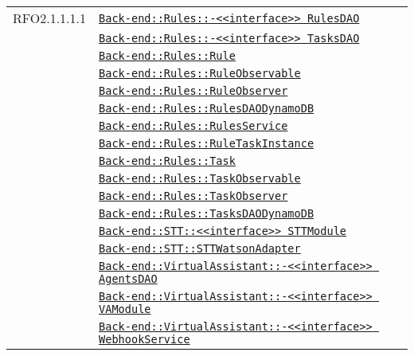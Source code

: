 \begin{longtable}{|>{\centering}m{3cm}|m{10cm}<{\centering}|}
RFO2.1.1.1.1 & \hyperref[Back-end::Rules::<<interface>> RulesDAO]{\texttt{Back-end::Rules::-\linebreak <<interface>> RulesDAO}}\\
& \hyperref[Back-end::Rules::<<interface>> TasksDAO]{\texttt{Back-end::Rules::-\linebreak <<interface>> TasksDAO}}\\
& \hyperref[Back-end::Rules::Rule]{\texttt{Back-end::Rules::Rule}}\\
& \hyperref[Back-end::Rules::RuleObservable]{\texttt{Back-end::Rules::RuleObservable}}\\
& \hyperref[Back-end::Rules::RuleObserver]{\texttt{Back-end::Rules::RuleObserver}}\\
& \hyperref[Back-end::Rules::RulesDAODynamoDB]{\texttt{Back-end::Rules::RulesDAODynamoDB}}\\
& \hyperref[Back-end::Rules::RulesService]{\texttt{Back-end::Rules::RulesService}}\\
& \hyperref[Back-end::Rules::RuleTaskInstance]{\texttt{Back-end::Rules::RuleTaskInstance}}\\
& \hyperref[Back-end::Rules::Task]{\texttt{Back-end::Rules::Task}}\\
& \hyperref[Back-end::Rules::TaskObservable]{\texttt{Back-end::Rules::TaskObservable}}\\
& \hyperref[Back-end::Rules::TaskObserver]{\texttt{Back-end::Rules::TaskObserver}}\\
& \hyperref[Back-end::Rules::TasksDAODynamoDB]{\texttt{Back-end::Rules::TasksDAODynamoDB}}\\
& \hyperref[Back-end::STT::<<interface>> STTModule]{\texttt{Back-end::STT::<<interface>> STTModule}}\\
& \hyperref[Back-end::STT::STTWatsonAdapter]{\texttt{Back-end::STT::STTWatsonAdapter}}\\
& \hyperref[Back-end::VirtualAssistant::<<interface>> AgentsDAO]{\texttt{Back-end::VirtualAssistant::-\linebreak <<interface>> AgentsDAO}}\\
& \hyperref[Back-end::VirtualAssistant::<<interface>> VAModule]{\texttt{Back-end::VirtualAssistant::-\linebreak <<interface>> VAModule}}\\
& \hyperref[Back-end::VirtualAssistant::<<interface>> WebhookService]{\texttt{Back-end::VirtualAssistant::-\linebreak <<interface>> WebhookService}}\\

\end{longtable}
